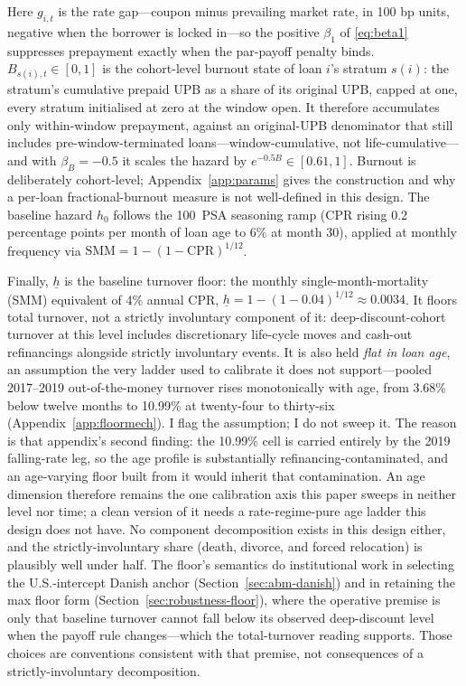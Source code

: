 Here $g_{i,t}$ is the rate gap---coupon minus prevailing market rate, in 100 bp units, negative when the borrower is locked in---so the positive $\beta_1$ of \eqref{eq:beta1} suppresses prepayment exactly when the par-payoff penalty binds. $B_{s(i),t} \in [0,1]$ is the cohort-level burnout state of loan $i$'s stratum $s(i)$: the stratum's cumulative prepaid UPB as a share of its original UPB, capped at one, every stratum initialised at zero at the window open. It therefore accumulates only within-window prepayment, against an original-UPB denominator that still includes pre-window-terminated loans---window-cumulative, not life-cumulative---and with $\beta_B = -0.5$ it scales the hazard by $e^{-0.5 B} \in [0.61, 1]$. Burnout is deliberately cohort-level; Appendix~\ref{app:params} gives the construction and why a per-loan fractional-burnout measure is not well-defined in this design. The baseline hazard $h_0$ follows the 100~PSA seasoning ramp (CPR rising 0.2 percentage points per month of loan age to 6\% at month 30), applied at monthly frequency via $\mathrm{SMM} = 1-(1-\mathrm{CPR})^{1/12}$.

Finally, $\underline{h}$ is the baseline turnover floor: the monthly single-month-mortality (SMM) equivalent of 4\% annual CPR, $\underline{h} = 1-(1-0.04)^{1/12} \approx 0.0034$. It floors total turnover, not a strictly involuntary component of it: deep-discount-cohort turnover at this level includes discretionary life-cycle moves and cash-out refinancings alongside strictly involuntary events. It is also held \emph{flat in loan age}, an assumption the very ladder used to calibrate it does not support---pooled 2017--2019 out-of-the-money turnover rises monotonically with age, from 3.68\% below twelve months to 10.99\% at twenty-four to thirty-six (Appendix~\ref{app:floormech}). I flag the assumption; I do not sweep it. The reason is that appendix's second finding: the 10.99\% cell is carried entirely by the 2019 falling-rate leg, so the age profile is substantially refinancing-contaminated, and an age-varying floor built from it would inherit that contamination. An age dimension therefore remains the one calibration axis this paper sweeps in neither level nor time; a clean version of it needs a rate-regime-pure age ladder this design does not have. No component decomposition exists in this design either, and the strictly-involuntary share (death, divorce, and forced relocation) is plausibly well under half. The floor's semantics do institutional work in selecting the U.S.-intercept Danish anchor (Section~\ref{sec:abm-danish}) and in retaining the max floor form (Section~\ref{sec:robustness-floor}), where the operative premise is only that baseline turnover cannot fall below its observed deep-discount level when the payoff rule changes---which the total-turnover reading supports. Those choices are conventions consistent with that premise, not consequences of a strictly-involuntary decomposition.

